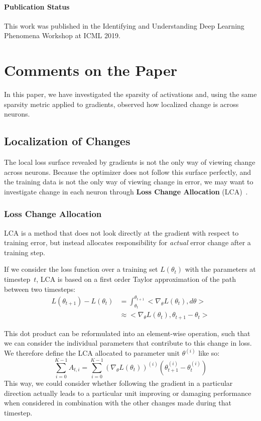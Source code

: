 \paragraph*{Publication Status } This work was published in the Identifying and Understanding Deep Learning Phenomena Workshop at ICML 2019.




\section{Comments on the Paper}

In this paper, we have investigated the sparsity of activations and, using the same sparsity metric applied to gradients, observed how localized change is across neurons. 

\subsection{Localization of Changes}

The local loss surface revealed by gradients is not the only way of viewing change across neurons. Because the optimizer does not follow this surface perfectly, and the training data is not the only way of viewing change in error, we may want to investigate change in each neuron through \textbf{Loss Change Allocation} (LCA)~\citep{lan_lca:_2019}.

\subsubsection{Loss Change Allocation} \label{sec:lca}

LCA is a method that does not look directly at the gradient with respect to training error, but instead allocates responsibility for \textit{actual} error change after a training step.

If we consider the loss function over a training set $L(\theta_t)$ with the parameters at timestep~$t$, LCA is based on a first order Taylor approximation of the path between two timesteps:
\begin{align}
    L(\theta_{t+1}) - L(\theta_t) &= \int_{\theta_t}^{\theta_{t+1}} <\nabla_{\theta} L(\theta_t), d \theta>\\
    & \approx < \nabla_\theta L(\theta_t), \theta_{t+1} - \theta_t>
\end{align}

This dot product can be reformulated into an element-wise operation, such that we can consider the individual parameters that contribute to this change in loss. We therefore define the LCA allocated to parameter unit $\theta^{(i)}$ like so:
\begin{equation}
    \sum_{i=0}^{K-1} A_{t,i} = \sum_{i=0}^{K-1} (\nabla_{\theta} L(\theta_t))^{(i)} (\theta_{t+1}^{(i)} - \theta_t^{(i)})
\end{equation}
This way, we could consider whether following the gradient in a particular direction actually leads to a particular unit improving or damaging performance when considered in combination with the other changes made during that timestep. 


